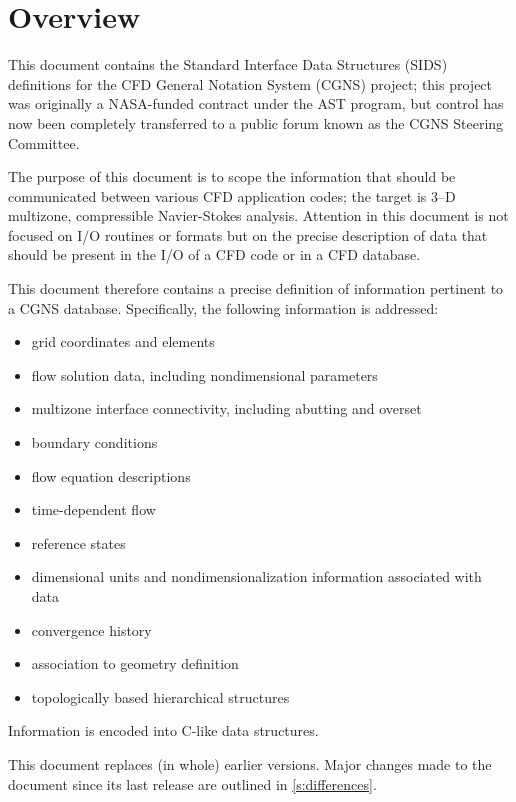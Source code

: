 \hypertarget{overview}{}
\section*{Overview}
\thispagestyle{plain}

This document contains the Standard Interface Data Structures (SIDS)
definitions for the CFD General Notation System (CGNS) project; this
project was originally a NASA-funded contract under the AST program, but
control has now been completely transferred to a public forum known as
the CGNS Steering Committee.

The purpose of this document is to scope the information that should be
communicated between various CFD application codes; the target is 3--D
multizone, compressible Navier-Stokes analysis.
Attention in this document is not focused on I/O routines or formats
but on the precise description of data that should be present in the I/O
of a CFD code or in a CFD database.

This document therefore contains a precise definition of information
pertinent to a CGNS database.
Specifically, the following information is addressed:
\begin{itemize}
\item grid coordinates and elements
\item flow solution data, including nondimensional parameters
\item multizone interface connectivity, including abutting and overset
\item boundary conditions
\item flow equation descriptions
\item time-dependent flow
\item reference states
\item dimensional units and nondimensionalization information associated
      with data
\item convergence history
\item association to geometry definition
\item topologically based hierarchical structures
\end{itemize}
Information is encoded into C-like data structures.

This document replaces (in whole) earlier versions. Major changes made to the
document since its last release are outlined in \autoref{s:differences}.

